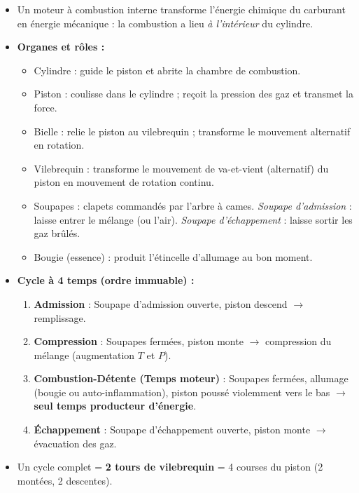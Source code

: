 \documentclass[11pt]{article}
\newcommand{\cle}[1]{{\popxbold\color{popdark}#1}}
\begin{document}
\begin{aretenir}
\begin{itemize}
\item Un \cle{moteur à combustion interne} transforme l'énergie chimique du carburant en énergie mécanique : la combustion a lieu \emph{à l'intérieur} du cylindre.
\item \textbf{Organes et rôles :}
\begin{itemize}
\item \cle{Cylindre} : guide le piston et abrite la chambre de combustion.
\item \cle{Piston} : coulisse dans le cylindre ; reçoit la pression des gaz et transmet la force.
\item \cle{Bielle} : relie le piston au vilebrequin ; transforme le mouvement alternatif en rotation.
\item \cle{Vilebrequin} : transforme le mouvement de va-et-vient (alternatif) du piston en mouvement de rotation continu.
\item \cle{Soupapes} : clapets commandés par l'arbre à cames. \emph{Soupape d'admission} : laisse entrer le mélange (ou l'air). \emph{Soupape d'échappement} : laisse sortir les gaz brûlés.
\item \cle{Bougie} (essence) : produit l'étincelle d'allumage au bon moment.
\end{itemize}
\item \textbf{Cycle à 4 temps (ordre immuable) :}
\begin{enumerate}
\item \textbf{Admission} : Soupape d'admission ouverte, piston descend $\rightarrow$ remplissage.
\item \textbf{Compression} : Soupapes fermées, piston monte $\rightarrow$ compression du mélange (augmentation $T$ et $P$).
\item \textbf{Combustion-Détente (Temps moteur)} : Soupapes fermées, allumage (bougie ou auto-inflammation), piston poussé violemment vers le bas $\rightarrow$ \textbf{seul temps producteur d'énergie}.
\item \textbf{Échappement} : Soupape d'échappement ouverte, piston monte $\rightarrow$ évacuation des gaz.
\end{enumerate}
\item Un cycle complet = \textbf{2 tours de vilebrequin} = 4 courses du piston (2 montées, 2 descentes).
\end{itemize}
\end{aretenir}
\end{document}
